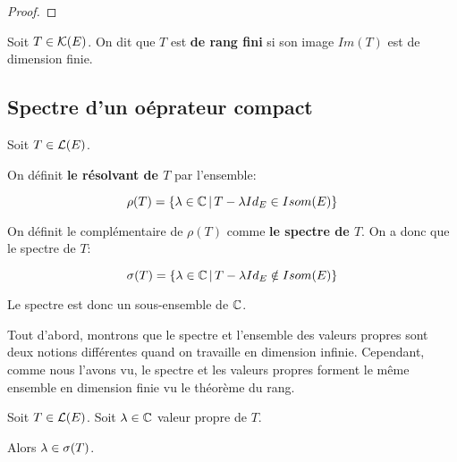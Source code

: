 \begin{proof}
	
\end{proof}

\begin{definition}
	Soit $T \in \mathcal{K}(E)$. On dit que $T$ est \textbf{de rang fini}
	si son image $Im(T)$ est de dimension finie.
\end{definition}

\begin{proposition}
	
\end{proposition}

\subsection{Spectre d'un oéprateur compact}

\begin{definition}
	Soit $T \in \mathcal{L}(E)$.

	On définit \textbf{le résolvant de $T$} par l'ensemble:

	\begin{equation}
		\rho(T) = \left\{\lambda \in \mathbb{C} \, | \, T - \lambda
			{Id}_{E} \in Isom(E) \right\}
			\label{def:resolvant_operator}
	\end{equation}

	On définit le complémentaire de $\rho(T)$ comme \textbf{le spectre de $T$}.
	On a donc que le spectre de $T$:

	\begin{equation}
		\sigma(T) = \left\{\lambda \in \mathbb{C} \, | \, T - \lambda {Id}_{E}
		\notin Isom(E) \right\}
		\label{def:spectrum_operator}
	\end{equation}
\end{definition}

Le spectre est donc un sous-ensemble de $\mathbb{C}$.

Tout d'abord, montrons que le spectre et l'ensemble des valeurs propres sont
deux notions différentes quand on travaille en dimension infinie. Cependant,
comme nous l'avons vu, le spectre et les valeurs propres forment le même
ensemble en dimension finie vu le théorème du rang.

\begin{proposition}
	Soit $T \in \mathcal{L}(E)$.
	Soit $\lambda \in \mathbb{C}$ valeur propre de $T$.

	Alors $\lambda \in \sigma(T)$.
\end{proposition}

